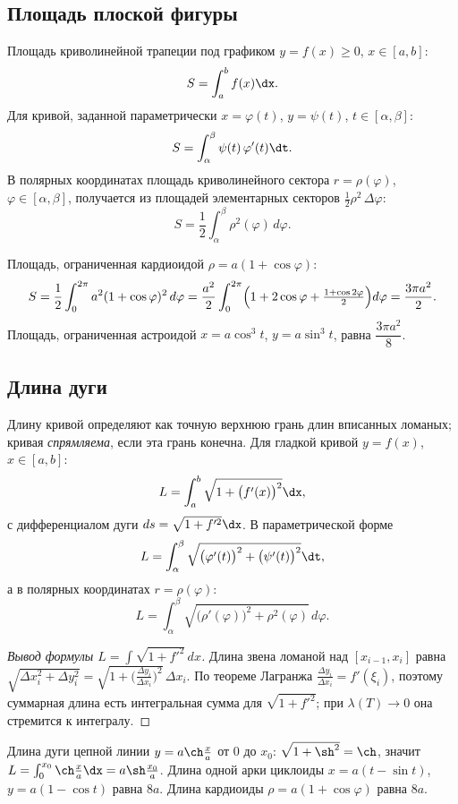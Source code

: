 \subsection{Площадь плоской фигуры}

Площадь криволинейной трапеции под графиком $y=f(x)\ge0$, $x\in[a,b]$:
\[
  S=\int_a^b f(x)\dx .
\]
Для кривой, заданной параметрически $x=\varphi(t)$, $y=\psi(t)$, $t\in[\alpha,\beta]$:
\[
  S=\int_\alpha^\beta \psi(t)\,\varphi'(t)\dt .
\]
В полярных координатах площадь криволинейного сектора $r=\rho(\varphi)$,
$\varphi\in[\alpha,\beta]$, получается из площадей элементарных секторов
$\tfrac12\rho^2\,\Delta\varphi$:
\[
  S=\frac12\int_\alpha^\beta \rho^2(\varphi)\,d\varphi .
\]

\begin{example}
Площадь, ограниченная кардиоидой $\rho=a(1+\cos\varphi)$:
\[
  S=\frac12\int_0^{2\pi}a^2(1+\cos\varphi)^2\,d\varphi=\frac{a^2}{2}\int_0^{2\pi}
   \Bigl(1+2\cos\varphi+\tfrac{1+\cos2\varphi}{2}\Bigr)d\varphi=\frac{3\pi a^2}{2}.
\]
Площадь, ограниченная астроидой $x=a\cos^3t$, $y=a\sin^3t$, равна $\dfrac{3\pi a^2}{8}$.
\end{example}

\subsection{Длина дуги}

Длину кривой определяют как точную верхнюю грань длин вписанных ломаных; кривая
\emph{спрямляема}, если эта грань конечна. Для гладкой кривой $y=f(x)$, $x\in[a,b]$:
\[
  L=\int_a^b\sqrt{1+\bigl(f'(x)\bigr)^2}\dx,
\]
с дифференциалом дуги $ds=\sqrt{1+f'^2}\dx$. В параметрической форме
\[
  L=\int_\alpha^\beta\sqrt{\bigl(\varphi'(t)\bigr)^2+\bigl(\psi'(t)\bigr)^2}\dt,
\]
а в полярных координатах $r=\rho(\varphi)$:
\[
  L=\int_\alpha^\beta\sqrt{\bigl(\rho'(\varphi)\bigr)^2+\rho^2(\varphi)}\,d\varphi .
\]

\begin{proof}[Вывод формулы $L=\int\sqrt{1+f'^2}\,dx$]
Длина звена ломаной над $[x_{i-1},x_i]$ равна
$\sqrt{\Delta x_i^2+\Delta y_i^2}=\sqrt{1+\bigl(\tfrac{\Delta y_i}{\Delta x_i}\bigr)^2}\,\Delta x_i$.
По теореме Лагранжа $\tfrac{\Delta y_i}{\Delta x_i}=f'(\xi_i)$, поэтому суммарная длина есть
интегральная сумма для $\sqrt{1+f'^2}$; при $\lambda(T)\to0$ она стремится к интегралу.
\end{proof}

\begin{example}
Длина дуги цепной линии $y=a\ch\frac xa$ от $0$ до $x_0$:
$\sqrt{1+\sh^2}=\ch$, значит $L=\int_0^{x_0}\ch\frac xa\dx=a\sh\frac{x_0}a$. Длина одной арки
циклоиды $x=a(t-\sin t)$, $y=a(1-\cos t)$ равна $8a$. Длина кардиоиды $\rho=a(1+\cos\varphi)$
равна $8a$.
\end{example}

